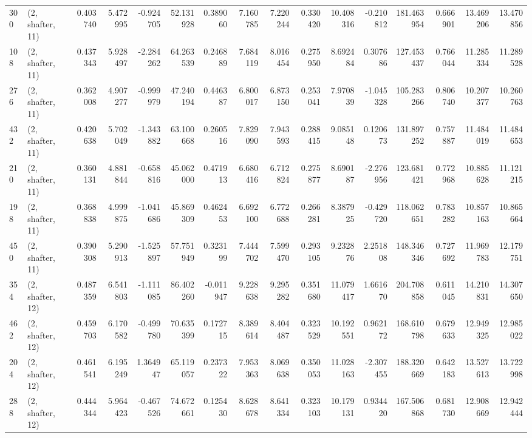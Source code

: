 \begin{tabular}{llrrrrrrrrrrrrrr}
300 &  (2, shafter, 11) &   0.403740 &   5.472995 &  -0.924705 &    52.131928 &   0.389060 &   7.160785 &   7.220244 &  0.330420 &  10.408316 &  -0.210812 &   181.463954 &  0.666901 &  13.469206 &  13.470856 \\
108 &  (2, shafter, 11) &   0.437343 &   5.928497 &  -2.284262 &    64.263539 &   0.246889 &   7.684119 &   8.016454 &  0.275950 &   8.692484 &   0.307686 &   127.453437 &  0.766044 &  11.285334 &  11.289528 \\
276 &  (2, shafter, 11) &   0.362008 &   4.907277 &  -0.999979 &    47.240194 &   0.446387 &   6.800017 &   6.873150 &  0.253041 &   7.970839 &  -1.045328 &   105.283266 &  0.806740 &  10.207377 &  10.260763 \\
432 &  (2, shafter, 11) &   0.420638 &   5.702049 &  -1.343882 &    63.100668 &   0.260516 &   7.829090 &   7.943593 &  0.288415 &   9.085148 &   0.120673 &   131.897252 &  0.757887 &  11.484019 &  11.484653 \\
210 &  (2, shafter, 11) &   0.360131 &   4.881844 &  -0.658816 &    45.062000 &   0.471913 &   6.680416 &   6.712824 &  0.275877 &   8.690187 &  -2.276956 &   123.681421 &  0.772968 &  10.885628 &  11.121215 \\
198 &  (2, shafter, 11) &   0.368838 &   4.999875 &  -1.041686 &    45.869309 &   0.462453 &   6.692100 &   6.772688 &  0.266281 &   8.387925 &  -0.429720 &   118.062651 &  0.783282 &  10.857163 &  10.865664 \\
450 &  (2, shafter, 11) &   0.390308 &   5.290913 &  -1.525897 &    57.751949 &   0.323199 &   7.444702 &   7.599470 &  0.293105 &   9.232876 &   2.251808 &   148.346346 &  0.727692 &  11.969783 &  12.179751 \\
354 &  (2, shafter, 12) &   0.487359 &   6.541803 &  -1.111085 &    86.402260 &  -0.011947 &   9.228638 &   9.295282 &  0.351680 &  11.079417 &   1.661670 &   204.708858 &  0.611045 &  14.210831 &  14.307650 \\
462 &  (2, shafter, 12) &   0.459703 &   6.170582 &  -0.499780 &    70.635399 &   0.172715 &   8.389614 &   8.404487 &  0.323529 &  10.192551 &   0.962172 &   168.610798 &  0.679633 &  12.949325 &  12.985022 \\
204 &  (2, shafter, 12) &   0.461541 &   6.195249 &   1.364947 &    65.119057 &   0.237322 &   7.953363 &   8.069638 &  0.350053 &  11.028163 &  -2.307455 &   188.320669 &  0.642183 &  13.527613 &  13.722998 \\
288 &  (2, shafter, 12) &   0.444344 &   5.964423 &  -0.467526 &    74.672661 &   0.125430 &   8.628678 &   8.641334 &  0.323103 &  10.179131 &   0.934420 &   167.506868 &  0.681730 &  12.908669 &  12.942444 \\

\end{tabular}
